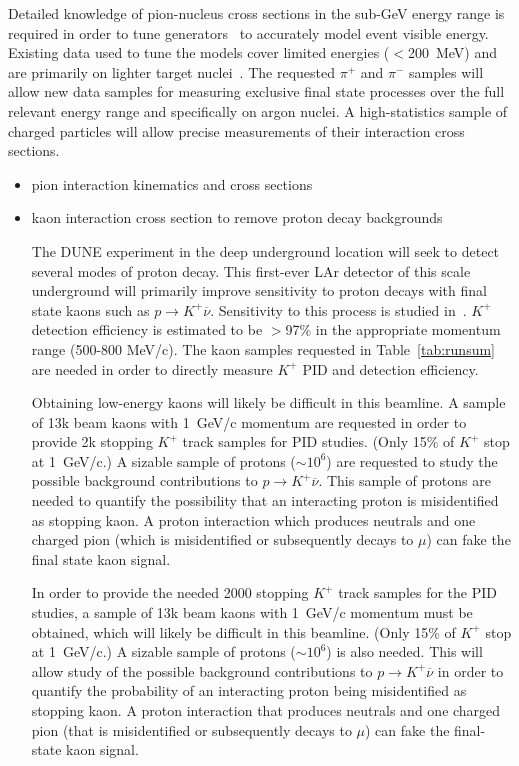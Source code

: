 Detailed knowledge of pion-nucleus cross sections in the sub-GeV energy range is required in order
to tune generators~\cite{genie} to accurately model event visible energy. 
Existing data used to tune the models cover limited energies ($<$200~MeV) and are primarily on lighter target nuclei~\cite{fsirev}.
The requested $\pi^+$ and $\pi^-$ samples will allow new data samples for measuring
exclusive final state processes over the full relevant energy range and specifically on argon nuclei. 
A high-statistics sample of charged particles will allow precise measurements of their interaction cross sections.

\begin{itemize}
\item pion interaction kinematics and cross sections
\item kaon interaction cross section to remove proton decay backgrounds


The DUNE experiment in the deep underground location will seek to detect several modes of proton decay.
This first-ever LAr detector of this scale underground will primarily improve sensitivity to 
proton decays with final state kaons such as  ${p \rightarrow K^+ \overline{\nu}}$. 
Sensitivity to this process is studied in~\cite{bueno}. $K^+$ detection efficiency is estimated to be $>$97\% in the
appropriate momentum range (500-800 MeV/c). The kaon samples requested in Table~\ref{tab:runsum} are needed in order to directly measure 
$K^+$ PID and detection efficiency. 

Obtaining low-energy kaons will likely be difficult in this beamline.
A sample of 13k beam kaons with 1~GeV/c momentum are requested   in order to provide 2k stopping $K^+$ track samples for PID studies.
(Only 15\% of $K^+$ stop at 1~GeV/c.)
A sizable sample of protons ($\sim 10^6$)
are requested  to study the possible background contributions to  $p \rightarrow K^+ \overline{\nu}$.
This sample of  protons are needed to quantify the possibility that an interacting proton 
is  misidentified as stopping kaon. A proton interaction which produces neutrals and one charged pion 
(which is misidentified or subsequently decays to $\mu$) can fake the final state kaon signal.

In order to provide the needed 2000 stopping $K^+$ track samples for the PID studies, a sample of 13k beam kaons with 1~GeV/c momentum must be obtained, which will likely be difficult in this beamline. (Only 15\% of $K^+$ stop at 1~GeV/c.)
A sizable sample of protons ($\sim 10^6$)
is also needed. This will allow study of the possible background contributions to $p \rightarrow K^+ \overline{\nu}$ in order to quantify the probability of an interacting proton 
being misidentified as stopping kaon. A proton interaction that produces neutrals and one charged pion 
(that is misidentified or subsequently decays to $\mu$) can fake the final-state kaon signal.


\end{itemize}
